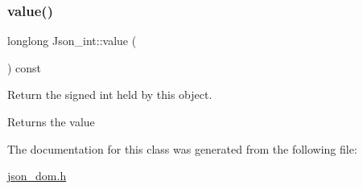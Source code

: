 \subsubsection{\texorpdfstring{value()}{value()}}
{\footnotesize\ttfamily longlong Json\+\_\+int\+::value (\begin{DoxyParamCaption}{ }\end{DoxyParamCaption}) const\hspace{0.3cm}{\ttfamily [inline]}}

Return the signed int held by this object. \begin{DoxyReturn}{Returns}
the value 
\end{DoxyReturn}


The documentation for this class was generated from the following file\+:\begin{DoxyCompactItemize}
\item 
\mbox{\hyperlink{json__dom_8h}{json\+\_\+dom.\+h}}\end{DoxyCompactItemize}
